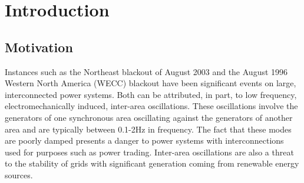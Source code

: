 \documentclass[conference]{IEEEtran}
\begin{document}
\section{Introduction}
\subsection{Motivation}
Instances such as the Northeast blackout of August 2003 and the August 1996 Western North America (WECC)\cite{NAERC} blackout have been significant events on large, interconnected power systems. Both can be attributed, in part, to low frequency, electromechanically induced, inter-area oscillations\cite{NAERC}. These oscillations involve the generators of one synchronous area oscillating against the generators of another area and are typically between 0.1-2Hz in frequency. The fact that these modes are poorly damped\cite{WAPODNorway} presents a danger to power systems with interconnections used for purposes such as power trading. Inter-area oscillations are also a threat to the stability of grids with significant generation coming from renewable energy sources.
\end{document}

